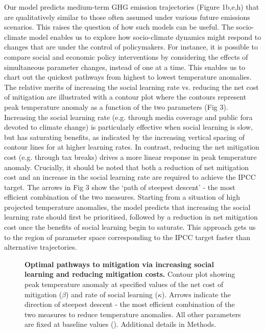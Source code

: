 \documentclass[10pt,letterpaper]{article}
\begin{document}
Our model predicts medium-term GHG emission trajectories (Figure 1b,e,h) that are qualitatively similar to those often assumed under various future emissions scenarios. This raises the question of how such models can be useful. The socio-climate model enables us to explore how socio-climate dynamics might respond to changes that are under the control of policymakers. For instance, it is possible to compare social and economic policy interventions by considering the effects of simultaneous parameter changes, instead of one at a time. This enables us to chart out the quickest pathways from highest to lowest temperature anomalies. The relative merits of increasing the social learning rate vs. reducing the net cost of mitigation are illustrated with a contour plot where the contours represent peak temperature anomaly as a function of the two parameters (Fig 3). Increasing the social learning rate (e.g. through media coverage and public fora devoted to climate change) is particularly effective when social learning is slow, but has saturating benefits, as indicated by the increasing vertical spacing of contour lines for at higher learning rates. In contrast, reducing the net mitigation cost (e.g. through tax breaks) drives a more linear response in peak temperature anomaly. Crucially, it should be noted that both a reduction of net mitigation cost and an increase in the social learning rate are required to achieve the IPCC target. The arrows in Fig 3 show the `path of steepest descent' - the most efficient combination of the two measures. Starting from a situation of high projected temperature anomalies, the model predicts that increasing the social learning rate should first be prioritised, followed by a reduction in net mitigation cost once the benefits of social learning begin to saturate. This approach gets us to the region of parameter space corresponding to the IPCC target faster than alternative trajectories.


\begin{figure}[!ht]
\caption{{\bf Optimal pathways to mitigation via increasing social learning and reducing mitigation costs.}
Contour plot showing peak temperature anomaly at specified values of the net cost of mitigation ($\beta$) and rate of social learning ($\kappa$). Arrows indicate the direction of steepest descent - the most efficient combination of the two measures to reduce temperature anomalies. All other parameters are fixed at baseline values (). Additional details in Methods.}
\label{fig3}
\end{figure}
\end{document}
